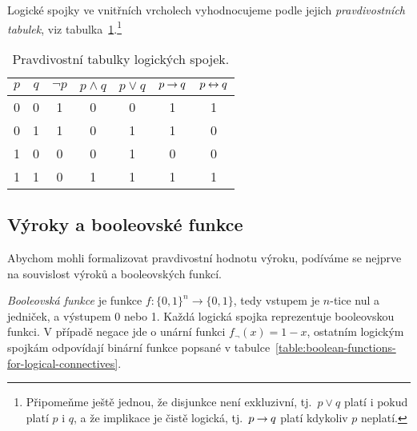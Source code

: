 Logické spojky ve vnitřních vrcholech vyhodnocujeme podle jejich \emph{pravdivostních tabulek}, viz tabulka~\ref{table:logical-connectives}.\footnote{Připomeňme ještě jednou, že disjunkce není exkluzivní, tj.\ $p\lor q$ platí i pokud platí $p$ i $q$, a že implikace je čistě logická, tj.\ $p\mathbin{\rightarrow} q$ platí kdykoliv $p$ neplatí.}

\begin{table}[htbp]
    \centering
    \begin{tabular}{@{}cc|ccccc@{}}
        \toprule
        $p$ & $q$ & $\neg p$ & $p\land q$ & $p\lor q$ & $p\mathbin{\rightarrow} q$ & $p\mathbin{\leftrightarrow} q$ \\ \midrule
        0   & 0   & 1        & 0          & 0         & 1          & 1          \\
        0   & 1   & 1        & 0          & 1         & 1          & 0          \\
        1   & 0   & 0        & 0          & 1         & 0          & 0          \\
        1   & 1   & 0        & 1          & 1         & 1          & 1          \\ \bottomrule
    \end{tabular}
    \caption{Pravdivostní tabulky logických spojek.}
    \label{table:logical-connectives}
\end{table}


\subsection{Výroky a booleovské funkce}

Abychom mohli formalizovat pravdivostní hodnotu výroku, podíváme se nejprve na souvislost výroků a booleovských funkcí.

\emph{Booleovská funkce} je funkce $f\colon\{0,1\}^n\to\{0,1\}$, tedy vstupem je $n$-tice nul a jedniček, a výstupem 0 nebo 1. Každá logická spojka reprezentuje booleovskou funkci. V případě negace jde o unární funkci $f_\neg(x)=1-x$, ostatním logickým spojkám odpovídají binární funkce popsané v tabulce~\ref{table:boolean-functions-for-logical-connectives}.

